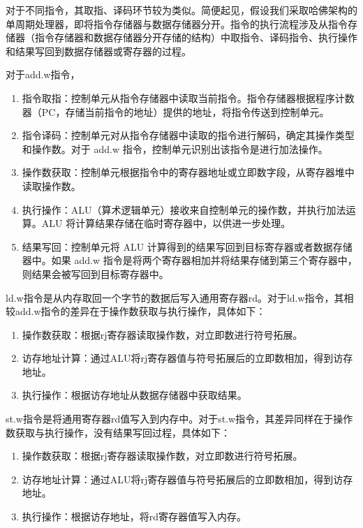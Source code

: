 对于不同指令，其取指、译码环节较为类似。简便起见，假设我们采取哈佛架构的单周期处理器，即将指令存储器与数据存储器分开。指令的执行流程涉及从指令存储器（指令存储器和数据存储器分开存储的结构）中取指令、译码指令、执行操作和结果写回到数据存储器或寄存器的过程。

对于add.w指令，

\begin{enumerate}
\def\labelenumi{\arabic{enumi}.}
\item
  指令取指：控制单元从指令存储器中读取当前指令。指令存储器根据程序计数器（PC，存储当前指令的地址）提供的地址，将指令传送到控制单元。
\item
  指令译码：控制单元对从指令存储器中读取的指令进行解码，确定其操作类型和操作数。对于 add.w 指令，控制单元识别出该指令是进行加法操作。
\item
  操作数获取：控制单元根据指令中的寄存器地址或立即数字段，从寄存器堆中读取操作数。
\item
  执行操作：ALU（算术逻辑单元）接收来自控制单元的操作数，并执行加法运算。ALU 将计算结果存储在临时寄存器中，以供进一步处理。
\item
  结果写回：控制单元将 ALU 计算得到的结果写回到目标寄存器或者数据存储器中。如果 add.w 指令是将两个寄存器相加并将结果存储到第三个寄存器中，则结果会被写回到目标寄存器中。
\end{enumerate}

ld.w指令是从内存取回一个字节的数据后写入通用寄存器rd。对于ld.w指令，其相较add.w指令的差异在于操作数获取与执行操作，具体如下：

\begin{enumerate}
\def\labelenumi{\arabic{enumi}.}
\item
  操作数获取：根据rj寄存器读取操作数，对立即数进行符号拓展。
\item
  访存地址计算：通过ALU将rj寄存器值与符号拓展后的立即数相加，得到访存地址。
\item
  执行操作：根据访存地址从数据存储器中获取结果。
\end{enumerate}

st.w指令是将通用寄存器rd值写入到内存中。对于st.w指令，其差异同样在于操作数获取与执行操作，没有结果写回过程，具体如下：

\begin{enumerate}
\def\labelenumi{\arabic{enumi}.}
\item
  操作数获取：根据rj寄存器读取操作数，对立即数进行符号拓展。
\item
  访存地址计算：通过ALU将rj寄存器值与符号拓展后的立即数相加，得到访存地址。
\item
  执行操作：根据访存地址，将rd寄存器值写入内存。
\end{enumerate}

